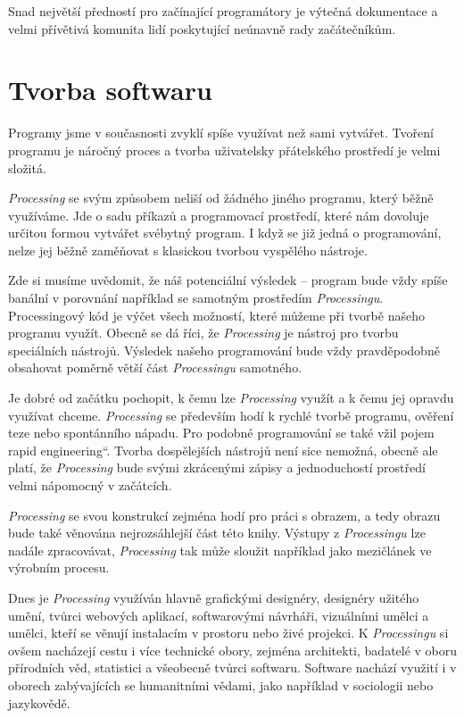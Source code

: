 \documentclass[10pt,twoside=true,open=right,cleardoublepage=empty,chapterprefix=true]{scrbook}
\renewcommand\uv[1]{\quotedblbase #1\textquotedblleft}%
\newcommand{\oddil}[1]{\section{#1}\index{#1}\label{#1}}
\newcommand{\lnb}{\linebreak}
\begin{document}
Snad největší předností pro začínající programátory je výtečná dokumentace a velmi přívětivá komunita lidí poskytující neúnavně rady začátečníkům.


\oddil{Tvorba softwaru}

Programy jsme v současnosti zvyklí spíše využívat než sami vytvářet. Tvoření programu je náročný proces a tvorba uživatelsky přátelského prostředí je velmi složitá.

{\em Processing} se svým způsobem neliší od žádného jiného programu, který běžně využíváme. Jde o sadu příkazů a programovací prostředí, které nám dovoluje určitou formou vytvářet svébytný program. I když se již jedná o programování, nelze jej běžně zaměňovat s klasickou tvorbou vyspělého nástroje.

Zde si musíme uvědomit, že náš potenciální výsledek -- program bude vždy spíše banální v porovnání například se samotným prostředím {\em Processingu}. Processingový kód je výčet všech možností, které můžeme při tvorbě našeho programu využít. Obecně se dá říci, že {\em Processing} je nástroj pro tvorbu speciálních nástrojů. Výsledek našeho programování bude vždy pravděpodobně obsahovat poměrně větší část {\em Processingu} samotného.

Je dobré od začátku pochopit, k čemu lze {\em Processing} využít a k čemu jej opravdu využívat chceme. {\em Processing} se především hodí k rychlé tvorbě programu, ověření teze nebo spontánního nápadu. Pro podobné programování se také vžil pojem \uv{rapid engineering}. Tvorba dospělejších nástrojů není sice nemožná, obecně ale platí, že {\em Processing} bude svými zkrácenými zápisy a jednoduchostí prostředí velmi nápomocný v začátcích. 

{\em Processing} se svou konstrukcí zejména hodí pro práci s obrazem, \lnb a tedy obrazu bude také věnována nejrozsáhlejší část této knihy. Výstupy \lnb z {\em Processingu} lze nadále zpracovávat, {\em Processing} tak může sloužit například jako mezičlánek ve výrobním procesu.

Dnes je {\em Processing} využíván hlavně grafickými designéry, designéry užitého umění, tvůrci webových aplikací, softwarovými návrháři, \lnb vizuálními umělci a umělci, kteří se věnují instalacím v prostoru nebo živé projekci. K {\em Processingu} si ovšem nacházejí cestu i více technické obory, zejména architekti, badatelé v oboru přírodních věd, statistici a všeobecně tvůrci softwaru. Software nachází využití i v oborech zabývajících se humanitními vědami, jako například v sociologii nebo jazykovědě.
\end{document}
